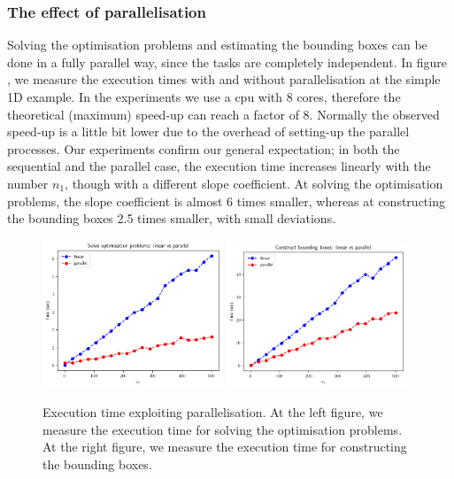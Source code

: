\subsubsection{The effect of parallelisation} \label{subsubsec:parallel}

Solving the optimisation problems and estimating the bounding boxes
can be done in a fully parallel way, since the tasks are completely
independent. In figure \label{fig:exec_parallel}, we measure the
execution times with and without parallelisation at the simple 1D
example. In the experiments we use a cpu with 8 cores, therefore the
theoretical (maximum) speed-up can reach a factor of 8. Normally the
observed speed-up is a little bit lower due to the overhead of
setting-up the parallel processes. Our experiments confirm our general
expectation; in both the sequential and the parallel case, the
execution time increases linearly with the number $n_1$, though with a
different slope coefficient. At solving the optimisation problems, the
slope coefficient is almost 6 times smaller, whereas at constructing
the bounding boxes 2.5 times smaller, with small deviations.

\begin{figure}[ht]
    \begin{center}
      \includegraphics[width=0.48\textwidth]{./Thesis/images/chapter4/solve_problems_parallel.png}
      \includegraphics[width=0.48\textwidth]{./Thesis/images/chapter4/estimate_regions_parallel.png}
    \end{center}
    \caption[Execution time exploiting parallelisation.]{Execution
      time exploiting parallelisation. At the left figure, we measure
      the execution time for solving the optimisation problems. At the
      right figure, we measure the execution time for constructing the
      bounding boxes.}
  \label{fig:exec_parallel}
\end{figure}

